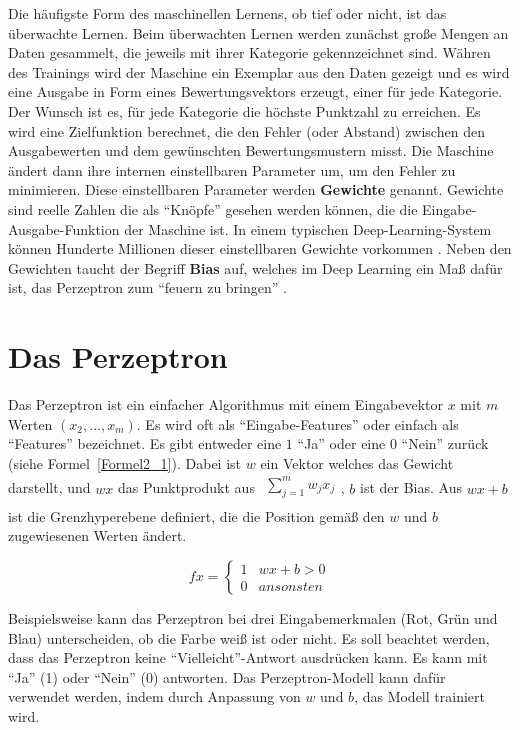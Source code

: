 Die häufigste Form des maschinellen Lernens, ob tief oder nicht, ist das überwachte Lernen. Beim überwachten Lernen werden zunächst große Mengen an Daten gesammelt, die jeweils mit ihrer Kategorie gekennzeichnet sind. Währen des Trainings wird der Maschine ein Exemplar aus den Daten gezeigt und es wird eine Ausgabe in Form eines Bewertungsvektors erzeugt, einer für jede Kategorie. Der Wunsch ist es, für jede Kategorie die höchste Punktzahl zu erreichen. Es wird eine Zielfunktion berechnet, die den Fehler (oder Abstand) zwischen den Ausgabewerten und dem gewünschten Bewertungsmustern misst. Die Maschine ändert dann ihre internen einstellbaren Parameter um, um den Fehler zu minimieren. Diese einstellbaren Parameter werden \textbf{Gewichte} genannt. Gewichte sind reelle Zahlen die als \enquote{Knöpfe} gesehen werden können, die die Eingabe-Ausgabe-Funktion der Maschine ist. In einem typischen Deep-Learning-System können Hunderte Millionen dieser einstellbaren Gewichte vorkommen \cite*{Lecun2015}. Neben den Gewichten taucht der Begriff \textbf{Bias} auf, welches im Deep Learning ein Maß dafür ist, das Perzeptron zum \enquote{feuern zu bringen} \cite*[7]{Nielsen2015}.


\section{Das Perzeptron}
Das Perzeptron ist ein einfacher Algorithmus mit einem Eingabevektor $x$ mit $m$ Werten $(x_2, ..., x_m)$. Es wird oft als \enquote{Eingabe-Features} oder einfach als \enquote{Features} bezeichnet. Es gibt entweder eine $1$ \enquote{Ja} oder eine $0$ \enquote{Nein} zurück (siehe Formel~\ref{Formel2_1}). Dabei ist $w$ ein Vektor welches das Gewicht darstellt, und $wx$ das Punktprodukt aus $\begin{array}{l}
        {\textstyle \sum ^{m}_{j=1}} w_{j} x_{j} \\
    \end{array}$, $b$ ist der Bias. Aus $wx + b$ ist die Grenzhyperebene definiert, die die Position gemäß den $w$ und $b$ zugewiesenen Werten ändert.

\begin{equation}
    fx=\begin{cases}
        1 & wx+b >0   \\
        0 & ansonsten
    \end{cases}
\end{equation}
\label{Perzeptron}

Beispielsweise kann das Perzeptron bei drei Eingabemerkmalen  (Rot, Grün und Blau) unterscheiden, ob die Farbe weiß ist oder nicht. Es soll beachtet werden, dass das Perzeptron keine \enquote{Vielleicht}-Antwort ausdrücken kann. Es kann mit \enquote{Ja} (1) oder \enquote{Nein} (0) antworten. Das Perzeptron-Modell kann dafür verwendet werden, indem durch Anpassung von $w$ und $b$, das Modell trainiert wird.



